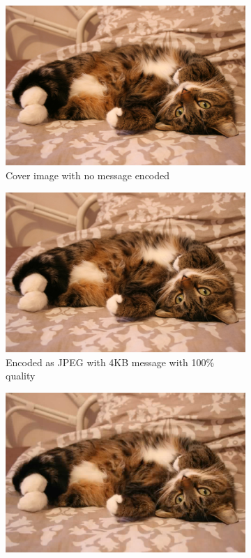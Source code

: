 \begin{figure}[H]
    \centering
    \begin{subfigure}[b]{0.45\textwidth}
        \includegraphics[width=\textwidth]{figures/catToTest.jpg}
		\caption{Cover image with no message encoded}
		\label{fig:catNoMessage}
    \end{subfigure}
    \begin{subfigure}[b]{0.45\textwidth}
        \includegraphics[width=\textwidth]{figures/catToTestHighMessage.jpeg}
		\caption{Encoded as JPEG with 4KB message with 100\% quality}
		\label{fig:catHighMessage}
    \end{subfigure}
    \begin{subfigure}[b]{0.45\textwidth}
        \includegraphics[width=\textwidth]{figures/catToTestNoMessage.jpeg}

\end{subfigure}
\end{figure}
